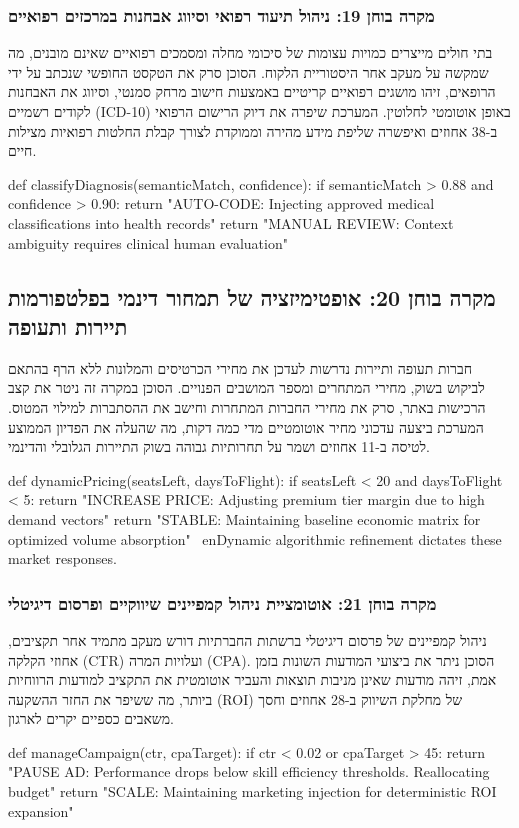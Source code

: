 \documentclass{hebrew-academic-template}
\begin{document}
\subsubsection{מקרה בוחן 19: ניהול תיעוד רפואי וסיווג אבחנות במרכזים רפואיים}
בתי חולים מייצרים כמויות עצומות של סיכומי מחלה ומסמכים רפואיים שאינם מובנים, מה שמקשה על מעקב אחר היסטוריית הלקוח. הסוכן סרק את הטקסט החופשי שנכתב על ידי הרופאים, זיהו מושגים רפואיים קריטיים באמצעות חישוב מרחק סמנטי, וסיווג את האבחנות לקודים רשמיים (ICD-10) באופן אוטומטי לחלוטין. המערכת שיפרה את דיוק הרישום הרפואי ב-38 אחוזים ואיפשרה שליפת מידע מהירה וממוקדת לצורך קבלת החלטות רפואיות מצילות חיים.
\begin{pythonbox}
def classifyDiagnosis(semanticMatch, confidence):
    if semanticMatch > 0.88 and confidence > 0.90:
        return "AUTO-CODE: Injecting approved medical classifications into health records"
    return "MANUAL REVIEW: Context ambiguity requires clinical human evaluation"
\end{pythonbox}

\subsection{מקרה בוחן 20: אופטימיזציה של תמחור דינמי בפלטפורמות תיירות ותעופה}
חברות תעופה ותיירות נדרשות לעדכן את מחירי הכרטיסים והמלונות ללא הרף בהתאם לביקוש בשוק, מחירי המתחרים ומספר המושבים הפנויים. הסוכן במקרה זה ניטר את קצב הרכישות באתר, סרק את מחירי החברות המתחרות וחישב את ההסתברות למילוי המטוס. המערכת ביצעה עדכוני מחיר אוטומטיים מדי כמה דקות, מה שהעלה את הפדיון הממוצע לטיסה ב-11 אחוזים ושמר על תחרותיות גבוהה בשוק התיירות הגלובלי והדינמי.
\begin{pythonbox}
def dynamicPricing(seatsLeft, daysToFlight):
    if seatsLeft < 20 and daysToFlight < 5:
        return "INCREASE PRICE: Adjusting premium tier margin due to high demand vectors"
    return "STABLE: Maintaining baseline economic matrix for optimized volume absorption"
\ en{Dynamic algorithmic refinement dictates these market responses.}
\end{pythonbox}

\subsubsection{מקרה בוחן 21: אוטומציית ניהול קמפיינים שיווקיים ופרסום דיגיטלי}
ניהול קמפיינים של פרסום דיגיטלי ברשתות החברתיות דורש מעקב מתמיד אחר תקציבים, אחוזי הקלקה (CTR) ועלויות המרה (CPA). הסוכן ניתר את ביצועי המודעות השונות בזמן אמת, זיהה מודעות שאינן מניבות תוצאות והעביר אוטומטית את התקציב למודעות הרווחיות ביותר, מה ששיפר את החזר ההשקעה (ROI) של מחלקת השיווק ב-28 אחוזים וחסך משאבים כספיים יקרים לארגון.
\begin{pythonbox}
def manageCampaign(ctr, cpaTarget):
    if ctr < 0.02 or cpaTarget > 45:
        return "PAUSE AD: Performance drops below skill efficiency thresholds. Reallocating budget"
    return "SCALE: Maintaining marketing injection for deterministic ROI expansion"
\end{pythonbox}
\end{document}
